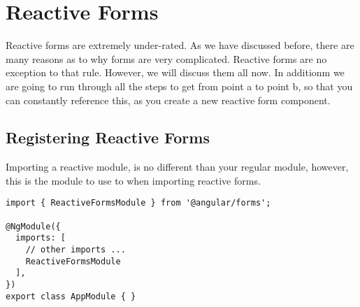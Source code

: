 \maketitle{}
\section{ Reactive Forms }

Reactive forms are extremely under-rated. As we have discussed before, there are 
many reasons as to why forms are very complicated. Reactive forms are no 
exception to that rule. However, we will discuss them all now. In additionm we
are going to run through all the steps to get from point a to point b, so that
you can constantly reference this, as you create a new reactive form component.

\subsection{ Registering Reactive Forms }

Importing a reactive module, is no different than your regular module, however,
this is the module to use to when importing reactive forms. 

\begin{lstlisting}
import { ReactiveFormsModule } from '@angular/forms';

@NgModule({
  imports: [
    // other imports ...
    ReactiveFormsModule
  ],
})
export class AppModule { }
\end{lstlisting}